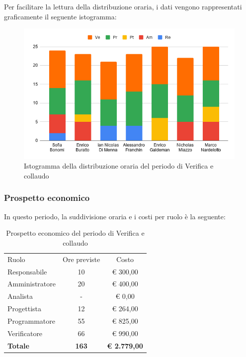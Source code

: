\documentclass[../piano-di-progetto.tex]{subfiles}
\begin{document}
  Per facilitare la lettura della distribuzione oraria, i dati vengono rappresentati graficamente il seguente istogramma:
  \begin{figure}[H]
    \centering
    \includegraphics[width=12cm]{img/ore-verifica.png}
    \caption{Istogramma della distribuzione oraria del periodo di Verifica e collaudo}
    \label{fig:ore-componente-verifica}
  \end{figure}

  \subsubsection{Prospetto economico}
  In questo periodo, la suddivisione oraria e i costi per ruolo è la seguente:

  \begin{table}[H]
    \centering
    \begin{tabular}{lcc}
      Ruolo           & Ore previste & Costo               \\
      Responsabile    & 10           & € 300,00            \\
      Amministratore  & 20           & € 400,00            \\
      Analista        & -            & € 0,00              \\
      Progettista     & 12           & € 264,00            \\
      Programmatore   & 55           & € 825,00            \\
      Verificatore    & 66           & € 990,00            \\
      \textbf{Totale} & \textbf{163} & \textbf{€ 2.779,00}
    \end{tabular}
    \caption{Prospetto economico del periodo di Verifica e collaudo}
  \end{table}
\end{document}
